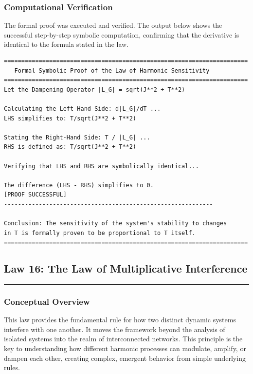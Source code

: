 \subsubsection*{Computational Verification}
The formal proof was executed and verified. The output below shows the successful step-by-step symbolic computation, confirming that the derivative is identical to the formula stated in the law.

\begin{verbatim}
======================================================================
   Formal Symbolic Proof of the Law of Harmonic Sensitivity
======================================================================
Let the Dampening Operator |L_G| = sqrt(J**2 + T**2)

Calculating the Left-Hand Side: d|L_G|/dT ...
LHS simplifies to: T/sqrt(J**2 + T**2)

Stating the Right-Hand Side: T / |L_G| ...
RHS is defined as: T/sqrt(J**2 + T**2)

Verifying that LHS and RHS are symbolically identical...

The difference (LHS - RHS) simplifies to 0.
[PROOF SUCCESSFUL]
------------------------------------------------------------

Conclusion: The sensitivity of the system's stability to changes
in T is formally proven to be proportional to T itself.
======================================================================
\end{verbatim}

\subsection*{Law 16: The Law of Multiplicative Interference}
\hrule
\vspace{0.3cm}
\vspace{0.5cm}

\subsubsection*{Conceptual Overview}
This law provides the fundamental rule for how two distinct dynamic systems interfere with one another. It moves the framework beyond the analysis of isolated systems into the realm of interconnected networks. This principle is the key to understanding how different harmonic processes can modulate, amplify, or dampen each other, creating complex, emergent behavior from simple underlying rules.

